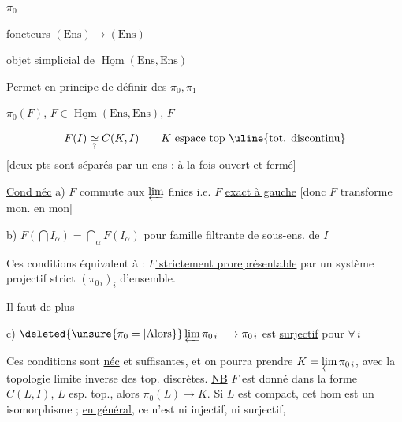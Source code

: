 $\pi_0$



foncteurs $(\mathrm{Ens})\to(\mathrm{Ens})$

objet simplicial de $\underline{\operatorname{Hom}}(\mathrm{Ens},\mathrm{Ens})$

Permet en principe de définir des $\pi_0,\pi_1$

$\pi_0(F)$, $F\in\underline{\operatorname{Hom}}(\mathrm{Ens},\mathrm{Ens})$, $F$

\[
F(I)\underset{?}{\simeq}C(K,I)\qquad K\ \text{espace top \uline{tot. discontinu}}
\]
[deux pts sont séparés par un ens : à la fois ouvert et fermé]

\uline{Cond néc} a) $F$ commute aux  $\varprojlim$ finies i.e. $F$ \uline{exact à gauche} [donc $F$ transforme mon. en mon]

b) $F(\bigcap I_\alpha)=\bigcap_\alpha F(I_\alpha)$ pour  famille filtrante de sous-ens. de $I$

Ces conditions équivalent à : \uline{$F$ strictement proreprésentable} par un système projectif strict $(\pi_{0\,i})_i$  d'ensemble.

Il faut de plus

c) $\deleted{\unsure{\pi_0=|\text{Alors}}}\varprojlim\pi_{0\,i}\longrightarrow\pi_{0\,i}$ est \uline{surjectif} pour $\forall\,i$

Ces conditions sont \uline{néc} et suffisantes, et on pourra prendre $K=\varprojlim\pi_{0\,i}$, avec la topologie limite inverse des top. discrètes. \uline{NB}  $F$ est donné dans la forme $C(L,I)$, $L$ esp. top., alors $\pi_0(L)\longrightarrow K$. Si $L$ est  compact, cet hom est un isomorphisme ; \uline{en général}, ce n'est ni injectif, ni surjectif,



